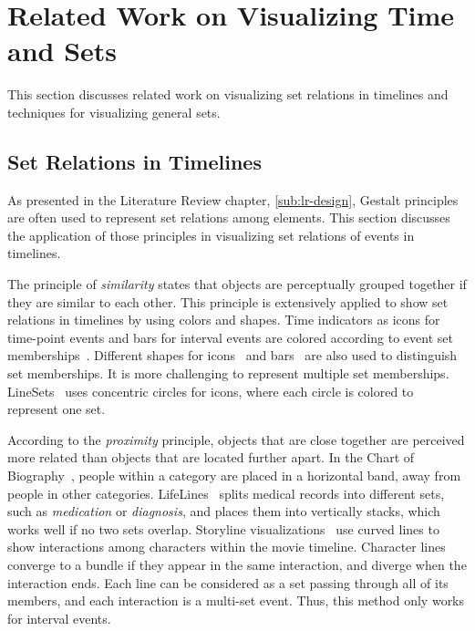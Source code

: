 \section{Related Work on Visualizing Time and Sets}
\label{sub:ts-review}

This section discusses related work on visualizing set relations in timelines and techniques for visualizing general sets.

\subsection{Set Relations in Timelines}
As presented in the Literature Review chapter, \autoref{sub:lr-design}, Gestalt principles are often used to represent set relations among elements. This section discusses the application of those principles in visualizing set relations of events in timelines.

The principle of \textit{similarity} states that objects are perceptually grouped together if they are similar to each other. This principle is extensively applied to show set relations in timelines by using colors and shapes. Time indicators as icons for time-point events and bars for interval events are colored according to event set memberships~\cite{SimileTimeline2009,Wang2008}. Different shapes for icons~\cite{TimeGlider2016} and bars~\cite{Plaisant1998} are also used to distinguish set memberships. It is more challenging to represent multiple set memberships. LineSets~\cite{Alper2011} uses concentric circles for icons, where each circle is colored to represent one set.

According to the \textit{proximity} principle, objects that are close together are perceived more related than objects that are located further apart. In the Chart of Biography~\cite{Priestley1765}, people within a category are placed in a horizontal band, away from people in other categories. LifeLines~\cite{Plaisant1998} splits medical records into different sets, such as \textit{medication} or \textit{diagnosis}, and places them into vertically stacks, which works well if no two sets overlap. Storyline visualizations~\cite{Tanahashi2012,Liu2013} use curved lines to show interactions among characters within the movie timeline. Character lines converge to a bundle if they appear in the same interaction, and diverge when the interaction ends. Each line can be considered as a set passing through all of its members, and each interaction is a multi-set event. Thus, this method only works for interval events.

